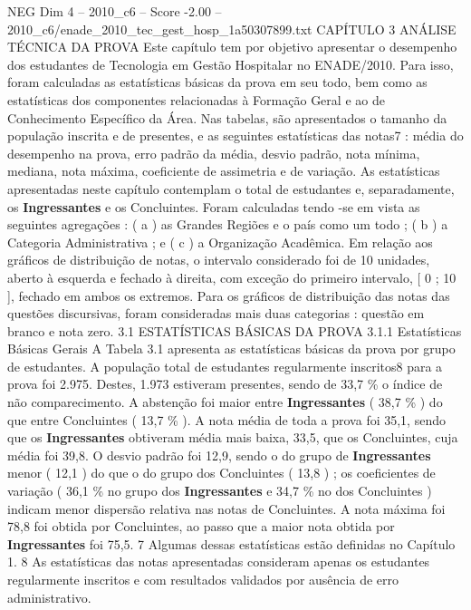 \begin{textsample}{NEG Dim 4 – 2010\_c6 – Score -2.00 – 2010\_c6/enade\_2010\_tec\_gest\_hosp\_1a50307899.txt}  \label{ex:f4_neg_049}
CAPÍTULO 3 ANÁLISE TÉCNICA DA PROVA Este capítulo tem por objetivo apresentar o desempenho dos estudantes de Tecnologia em Gestão Hospitalar no ENADE/2010.
Para isso, foram calculadas as estatísticas básicas da prova em seu todo, bem como as estatísticas dos componentes relacionadas à Formação Geral e ao de Conhecimento Específico da Área.
Nas tabelas, são apresentados o tamanho da população inscrita e de presentes, e as seguintes estatísticas das notas7 : média do desempenho na prova, erro padrão da média, desvio padrão, nota mínima, mediana, nota máxima, coeficiente de assimetria e de variação.
As estatísticas apresentadas neste capítulo contemplam o total de estudantes e, separadamente, os \textbf{Ingressantes} e os Concluintes.
Foram calculadas tendo -se em vista as seguintes agregações : ( a ) as Grandes Regiões e o país como um todo ; ( b ) a Categoria Administrativa ; e ( c ) a Organização Acadêmica.
Em relação aos gráficos de distribuição de notas, o intervalo considerado foi de 10 unidades, aberto à esquerda e fechado à direita, com exceção do primeiro intervalo, [ 0 ; 10 ], fechado em ambos os extremos.
Para os gráficos de distribuição das notas das questões discursivas, foram consideradas mais duas categorias : questão em branco e nota zero. 3.1 ESTATÍSTICAS BÁSICAS DA PROVA 3.1.1 Estatísticas Básicas Gerais A Tabela 3.1 apresenta as estatísticas básicas da prova por grupo de estudantes.
A população total de estudantes regularmente inscritos8 para a prova foi 2.975.
Destes, 1.973 estiveram presentes, sendo de 33,7 \% o índice de não comparecimento.
A abstenção foi maior entre \textbf{Ingressantes} ( 38,7 \% ) do que entre Concluintes ( 13,7 \% ).
A nota média de toda a prova foi 35,1, sendo que os \textbf{Ingressantes} obtiveram média mais baixa, 33,5, que os Concluintes, cuja média foi 39,8.
O desvio padrão foi 12,9, sendo o do grupo de \textbf{Ingressantes} menor ( 12,1 ) do que o do grupo dos Concluintes ( 13,8 ) ; os coeficientes de variação ( 36,1 \% no grupo dos \textbf{Ingressantes} e 34,7 \% no dos Concluintes ) indicam menor dispersão relativa nas notas de Concluintes.
A nota máxima foi 78,8 foi obtida por Concluintes, ao passo que a maior nota obtida por \textbf{Ingressantes} foi 75,5. 7 Algumas dessas estatísticas estão definidas no Capítulo 1. 8 As estatísticas das notas apresentadas consideram apenas os estudantes regularmente inscritos e com resultados validados por ausência de erro administrativo.

\end{textsample}
